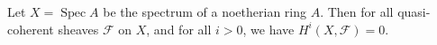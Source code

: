 Let $X = \operatorname{Spec} A$ be the spectrum of a noetherian ring $A$. Then for all quasi-coherent sheaves $\mathcal{F}$ on $X$, and for all $i > 0$, we have $H^i(X, \mathcal{F}) = 0$.
